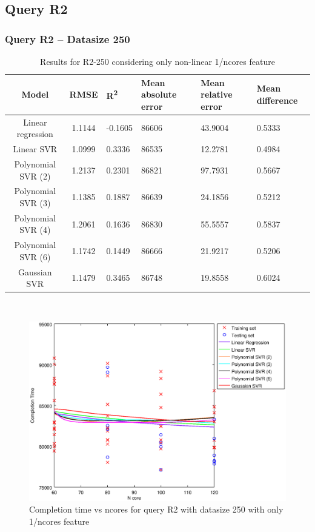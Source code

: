 \documentclass[a4paper,11pt]{article}
\begin{document}
\newpage
\subsection{Query R2}
\subsubsection{Query R2 -- Datasize 250}
\begin{table}[H]
	\centering
	\begin{adjustbox}{center}
		\begin{tabular}{c | c M{1.2cm} M{2.5cm} M{2.5cm} M{1.8cm}}
			Model & RMSE & R\textsuperscript{2} & Mean absolute error & Mean relative error & Mean difference \tabularnewline
			\hline
			Linear regression & 1.1144 & -0.1605 &  86606 & 43.9004 & 0.5333 \\
			Linear SVR & 1.0999 & 0.3336 &  86535 & 12.2781 & 0.4984 \\
			Polynomial SVR (2) & 1.2137 & 0.2301 &  86821 & 97.7931 & 0.5667 \\
			Polynomial SVR (3) & 1.1385 & 0.1887 &  86639 & 24.1856 & 0.5212 \\
			Polynomial SVR (4) & 1.2061 & 0.1636 &  86830 & 55.5557 & 0.5837 \\
			Polynomial SVR (6) & 1.1742 & 0.1449 &  86666 & 21.9217 & 0.5206 \\
			Gaussian SVR & 1.1479 & 0.3465 &  86748 & 19.8558 & 0.6024 \\
		\end{tabular}
	\end{adjustbox}
	\\
	\caption{Results for R2-250 considering only non-linear 1/ncores feature}
	\label{table_R2_prediction_all}
\end{table}

\begin {figure}[hbtp]
\centering
\includegraphics[width=\textwidth]{output/R2_250_ONLY_1_OVER_NCORES/plot_R2_250.eps}
\caption {Completion time vs ncores for query R2 with datasize 250 with only 1/ncores feature}
\end {figure}
\end{document}

